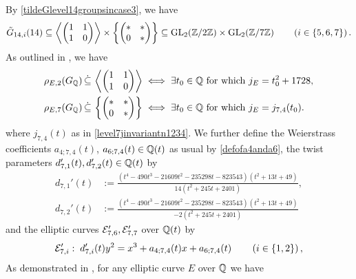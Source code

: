 By \eqref{tildeGlevel14groupsincase3}, we have
\[
\tilde{G}_{14,i}(14) \subseteq \left\langle \begin{pmatrix} 1 & 1 \\ 1 & 0 \end{pmatrix} \right\rangle \times \left\{ \begin{pmatrix} * & * \\ 0 & * \end{pmatrix} \right\} \subseteq \operatorname{GL}_2(\mathbb{Z}/2\mathbb{Z}) \times \operatorname{GL}_2(\mathbb{Z}/7\mathbb{Z}) \quad\quad \left( i \in \{5, 6, 7 \} \right).
\]
As outlined in \cite{zywina}, we have
\begin{equation}
\begin{split} \label{levels2and7models}
\rho_{E,2}(G_{\mathbb{Q}}) \, \dot\subseteq \, \left\langle \begin{pmatrix} 1 & 1 \\ 1 & 0 \end{pmatrix} \right\rangle \; &\Longleftrightarrow \; \exists t_0 \in \mathbb{Q} \text{ for which } j_E = t_0^2 + 1728, \\
\rho_{E,7}(G_{\mathbb{Q}}) \, \dot\subseteq \, \left\{ \begin{pmatrix} * & * \\ 0 & * \end{pmatrix} \right\} \; &\Longleftrightarrow \; \exists t_0 \in \mathbb{Q} \text{ for which } j_E = j_{7,4}(t_0).
\end{split}
\end{equation}
where $j_{7,4}(t)$ as in \eqref{level7jinvariantn1234}. We further define the Weierstrass coefficients $a_{4;7,4}(t)$, $a_{6;7,4}(t) \in \mathbb{Q}(t)$ as usual by \eqref{defofa4anda6}, the twist parameters $d_{7,1}'(t), d_{7,2}'(t) \in \mathbb{Q}(t)$ by
\begin{equation} \label{defofdsub76anddsub77}
\begin{split}
d_{7,1}'(t) &:= \frac{(t^4 - 490t^3 - 21609t^2 - 235298t - 823543)(t^2 + 13t + 49)}{14(t^2 + 245t + 2401)}, \\
d_{7,2}'(t) &:= \frac{(t^4 - 490t^3 - 21609t^2 - 235298t - 823543)(t^2 + 13t + 49)}{- 2(t^2 + 245t + 2401)}
\end{split}
\end{equation}
and the elliptic curves $\mathcal{E}_{7,6}', \mathcal{E}_{7,7}'$ over $\mathbb{Q}(t)$ by
\[
\mathcal{E}_{7,i}' : \; d_{7,i}'(t) y^2 = x^3 + a_{4;7,4}(t) x + a_{6;7,4}(t) \quad\quad \left( i \in \{ 1, 2 \} \right),
\]
As demonstrated in \cite{zywina}, for any elliptic curve $E$ over $\mathbb{Q}$ we have
